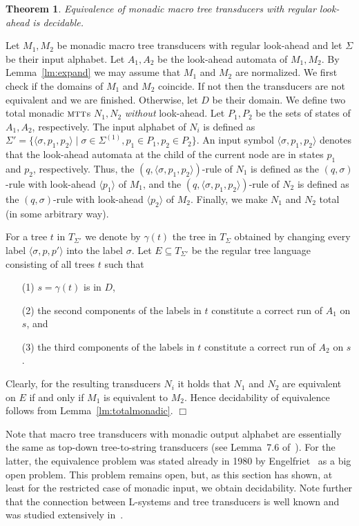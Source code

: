 \documentclass[copyright,creativecommons]{eptcs}
\newtheorem{theorem}{Theorem}
\newcommand{\eop}{\hspace*{\fill}$\Box$}
\newenvironment{proof}{{\it Proof.}\quad}{\eop\vspace*{4mm}}
\newcommand{\mtt}{\textsc{mtt}}
\begin{document}
\begin{theorem}
Equivalence of monadic macro tree transducers with regular look-ahead is decidable.
\end{theorem}
\begin{proof}
Let $M_1,M_2$ be monadic macro tree transducers with regular look-ahead
and let $\Sigma$ be their input alphabet.
Let $A_1, A_2$ be the look-ahead automata of $M_1, M_2$. 
By Lemma~\ref{lm:expand} we may assume that $M_1$ and $M_2$ are normalized.
We first check if the domains of $M_1$ and $M_2$ coincide. 
If not then the transducers are not equivalent and we are finished.
Otherwise, let $D$ be their domain. 
We define two total monadic $\mtt$s $N_1, N_2$ \emph{without} look-ahead. 
Let $P_1,P_2$ be the sets of states of $A_1,A_2$, respectively.
The input alphabet of $N_i$ is defined as
$\Sigma'=\{\langle\sigma,p_1,p_2\rangle\mid\sigma\in\Sigma^{(1)},p_1\in P_1, p_2\in P_2\}$. 
An input symbol $\langle\sigma, p_1,p_2\rangle$ denotes that the look-ahead automata
at the child of the current node are in states $p_1$ and $p_2$, respectively.
Thus, the $(q,\langle\sigma,p_1,p_2\rangle)$-rule of $N_1$ is defined as 
the $(q,\sigma)$-rule with look-ahead $\langle p_1\rangle$ of $M_1$,
and the $(q,\langle\sigma,p_1,p_2\rangle)$-rule of $N_2$ is defined as 
the $(q,\sigma)$-rule with look-ahead $\langle p_2\rangle$ of $M_2$.
Finally, we make $N_1$ and $N_2$ total (in some arbitrary way).

For a tree $t$ in $T_{\Sigma'}$ we denote by $\gamma(t)$ the tree in $T_\Sigma$ obtained
by changing every label $\langle \sigma,p,p'\rangle$ into the label $\sigma$. 
Let $E\subseteq T_{\Sigma'}$ be the regular tree language consisting of all trees
$t$ such that 
\begin{enumerate}
\item[(1)] $s=\gamma(t)$ is in $D$, 
\item[(2)] the second components of the labels in $t$ constitute a correct run of $A_1$ on $s$, and
\item[(3)] the  third components of the labels in $t$ constitute a correct run of $A_2$ on $s$.
\end{enumerate}
Clearly, for the resulting transducers $N_i$ it holds 
that $N_1$ and $N_2$ are equivalent on $E$ if and only if 
$M_1$ is equivalent to $M_2$. 
Hence decidability of equivalence follows from Lemma~\ref{lm:totalmonadic}.
\end{proof}

Note that macro tree transducers with monadic output alphabet are 
essentially the same as top-down tree-to-string transducers (see Lemma~7.6
of~\cite{DBLP:journals/iandc/EngelfrietM99}).
For the latter, the equivalence problem was stated already in 1980
by Engelfriet~\cite{eng80} as a big open problem.
This problem remains open, but, as this section has shown, at least
for the restricted case of monadic input, we obtain decidability.
Note further that the connection between L-systems and tree transducers
is well known and was studied extensively in~\cite{DBLP:journals/jcss/EngelfrietRS80}.
\end{document}

